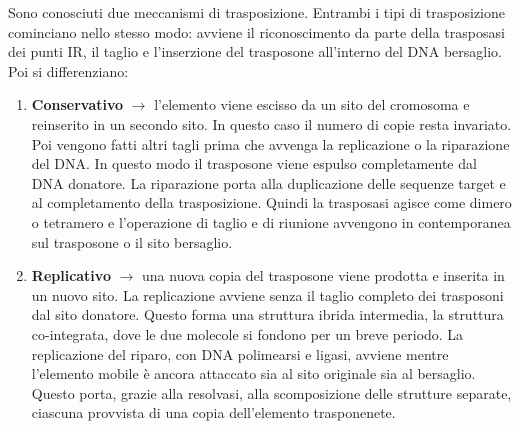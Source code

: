 Sono conosciuti due meccanismi di trasposizione. Entrambi i tipi di trasposizione cominciano nello stesso modo: avviene il riconoscimento da parte della trasposasi dei punti IR, il taglio e l'inserzione del trasposone all'interno del DNA bersaglio. Poi si differenziano:
\begin{enumerate}
    \item \textbf{Conservativo} $\xrightarrow{}$ l'elemento viene escisso da un sito del cromosoma e reinserito in un secondo sito. In questo caso il numero di copie resta invariato. Poi vengono fatti altri tagli prima che avvenga la replicazione o la riparazione del DNA. In questo modo il trasposone viene espulso completamente dal DNA donatore. La riparazione porta alla duplicazione delle sequenze target e al completamento della trasposizione. Quindi la trasposasi agisce come dimero o tetramero e l'operazione di taglio e di riunione avvengono in contemporanea sul trasposone o il sito bersaglio.
    \item \textbf{Replicativo} $\xrightarrow{}$ una nuova copia del trasposone viene prodotta e inserita in un nuovo sito. La replicazione avviene senza il taglio completo dei trasposoni dal sito donatore. Questo forma una struttura ibrida intermedia, la struttura co-integrata, dove le due molecole si fondono per un breve periodo. La replicazione del riparo, con DNA polimearsi e ligasi, avviene mentre l'elemento mobile è ancora attaccato sia al sito originale sia al bersaglio. Questo porta, grazie alla resolvasi, alla scomposizione delle strutture separate, ciascuna provvista di una copia dell'elemento trasponenete. 
\end{enumerate}
